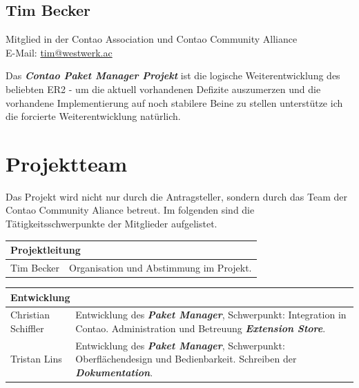 \documentclass[
paper=a4,
draft=false,%
fontsize=10pt%
]{scrartcl}
\newcommand{\contaoPackageManagerProject}{\textbf{\textit{Contao Paket Manager Projekt}}}
\newcommand{\packageManager}{\textbf{\textit{Paket Manager}}}
\newcommand{\store}{\textbf{\textit{Extension Store}}}
\newcommand{\documentation}{\textbf{\textit{Dokumentation}}}
\begin{document}
\subsection*{Tim  Becker}

Mitglied in der Contao Association und Contao Community Alliance \\
E-Mail: \href{mailto:tim@westwerk.ac}{tim@westwerk.ac}

\begin{emquote}{}
Das \contaoPackageManagerProject{} ist die logische Weiterentwicklung des beliebten ER2 - um die aktuell vorhandenen Defizite auszumerzen und die vorhandene Implementierung auf noch stabilere Beine zu stellen unterstütze ich die forcierte Weiterentwicklung natürlich.
\end{emquote}

\newpage

%
%

\section{Projektteam}
\label{sec:team}

Das Projekt wird nicht nur durch die Antragsteller, sondern durch das Team der Contao Community Aliance betreut. Im folgenden sind die Tätigkeitsschwerpunkte der Mitglieder aufgelistet.

\begin{tabularx}{\textwidth}{p{}X}
\multicolumn{2}{l}{\textbf{Projektleitung}} \\
\hline
Tim Becker          & Organisation und Abstimmung im Projekt. \\
\end{tabularx}

\begin{tabularx}{\textwidth}{p{}X}
\multicolumn{2}{l}{\textbf{Entwicklung}} \\
\hline
Christian Schiffler & Entwicklung des \packageManager{}, \newline
                      Schwerpunkt: Integration in Contao. \newline
                      Administration und Betreuung \store{}. \\
Tristan Lins        & Entwicklung des \packageManager{}, \newline
                      Schwerpunkt: Oberflächendesign und Bedienbarkeit. \newline
                      Schreiben der \documentation{}.
\end{tabularx}
\end{document}
